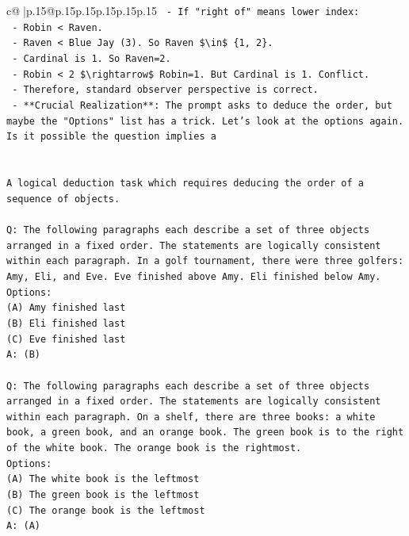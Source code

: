 \documentclass{article}
\begin{document}
{\begin{supertabular}{c@{$\;$}|p{.15\linewidth}@{}p{.15\linewidth}p{.15\linewidth}p{.15\linewidth}p{.15\linewidth}p{.15\linewidth}}
{{{\texttt{   {-} If "right of" means lower index:} \\
\texttt{     {-} Robin < Raven.} \\
\texttt{     {-} Raven < Blue Jay (3). So Raven \$\textbackslash{}in\$ \{1, 2\}.} \\
\texttt{     {-} Cardinal is 1. So Raven=2.} \\
\texttt{     {-} Robin < 2 \$\textbackslash{}rightarrow\$ Robin=1. But Cardinal is 1. Conflict.} \\
\texttt{   {-} Therefore, standard observer perspective is correct.} \\
\texttt{   {-} **Crucial Realization**: The prompt asks to deduce the order, but maybe the "Options" list has a trick. Let's look at the options again. Is it possible the question implies a} \\
\\ 
\\ 
\texttt{A logical deduction task which requires deducing the order of a sequence of objects.} \\
\\ 
\texttt{Q: The following paragraphs each describe a set of three objects arranged in a fixed order. The statements are logically consistent within each paragraph. In a golf tournament, there were three golfers: Amy, Eli, and Eve. Eve finished above Amy. Eli finished below Amy.} \\
\texttt{Options:} \\
\texttt{(A) Amy finished last} \\
\texttt{(B) Eli finished last} \\
\texttt{(C) Eve finished last} \\
\texttt{A: (B)} \\
\\ 
\texttt{Q: The following paragraphs each describe a set of three objects arranged in a fixed order. The statements are logically consistent within each paragraph. On a shelf, there are three books: a white book, a green book, and an orange book. The green book is to the right of the white book. The orange book is the rightmost.} \\
\texttt{Options:} \\
\texttt{(A) The white book is the leftmost} \\
\texttt{(B) The green book is the leftmost} \\
\texttt{(C) The orange book is the leftmost} \\
\texttt{A: (A)} \\
}}}
\end{supertabular}}
\end{document}
